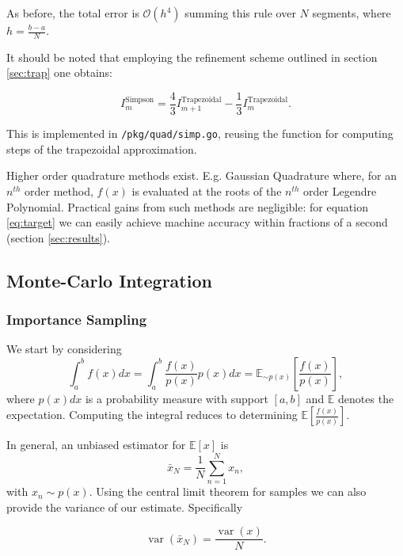 \documentclass[10pt, a4paper]{article}
\begin{document}
  As before, the total error is $\mathcal{O}(h^4)$ summing this rule over $N$ segments, where
  $h = \frac{b-a}{N}$.

  It should be noted that employing the refinement scheme outlined in section \ref{sec:trap} one
  obtains\cite{nr}:

  \begin{equation}
  I_m^{\text{Simpson}} = \frac{4}{3} I_{m+1}^{\text{Trapezoidal}} - \frac{1}{3} I_m^{\text{Trapezoidal}}.
  \end{equation}

  This is implemented in \texttt{/pkg/quad/simp.go}, reusing the function for computing steps of the
  trapezoidal approximation.

  Higher order quadrature methods exist. E.g. Gaussian Quadrature where, for an $n^{th}$
  order method, $f(x)$ is evaluated at the roots of the $n^{th}$ order Legendre Polynomial\cite{gauss}.
  Practical gains from such methods are negligible: for equation \ref{eq:target} we can easily achieve
  machine accuracy within fractions of a second (section \ref{sec:results}).

\subsection{Monte-Carlo Integration}
  \subsubsection{Importance Sampling}
  \label{sec:mon-is}

  We start by considering
  \begin{equation}
  \int_a^b f(x) dx = \int_{a}^{b} \frac{f(x)}{p(x)} p(x) dx = \mathbb{E}_{\sim p(x)}\left[ \frac{f(x)}{p(x)} \right],
  \end{equation}
  where $p(x)dx$ is a probability measure with support $[a, b]$ and $\mathbb{E}$ denotes the expectation.
  Computing the integral reduces to determining $\mathbb{E}\left[ \frac{f(x)}{p(x)} \right]$.

  In general, an unbiased estimator for $\mathbb{E}\left[ x \right]$ is
  \begin{equation}
  \bar{x}_N = \frac{1}{N} \sum_{n=1}^N x_n,
  \end{equation}
  with $x_n \sim p(x)$. Using the central limit theorem for \iid{} samples we can also provide the
  variance of our estimate. Specifically

  \begin{equation}
  \label{eq:var}
  \operatorname{var}(\bar{x}_N) = \frac{\operatorname{var}(x)}{N}.
  \end{equation}
\end{document}
